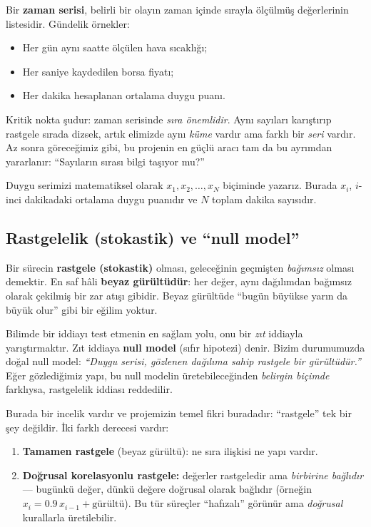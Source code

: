 \documentclass[11pt,a4paper]{article}
\begin{document}
Bir \textbf{zaman serisi}, belirli bir olayın zaman içinde sırayla ölçülmüş
değerlerinin listesidir. Gündelik örnekler:
\begin{itemize}[leftmargin=1.4em]
  \item Her gün aynı saatte ölçülen hava sıcaklığı;
  \item Her saniye kaydedilen borsa fiyatı;
  \item Her dakika hesaplanan ortalama duygu puanı.
\end{itemize}

Kritik nokta şudur: zaman serisinde \emph{sıra önemlidir}. Aynı sayıları
karıştırıp rastgele sırada dizsek, artık elimizde aynı \emph{küme} vardır ama
farklı bir \emph{seri} vardır. Az sonra göreceğimiz gibi, bu projenin en
güçlü aracı tam da bu ayrımdan yararlanır: ``Sayıların sırası bilgi taşıyor mu?''

Duygu serimizi matematiksel olarak $x_1, x_2, \dots, x_N$ biçiminde yazarız.
Burada $x_i$, $i$-inci dakikadaki ortalama duygu puanıdır ve $N$ toplam
dakika sayısıdır.

\subsection{Rastgelelik (stokastik) ve ``null model''}

Bir sürecin \textbf{rastgele (stokastik)} olması, geleceğinin geçmişten
\emph{bağımsız} olması demektir. En saf hâli \textbf{beyaz gürültüdür}:
her değer, aynı dağılımdan bağımsız olarak çekilmiş bir zar atışı gibidir.
Beyaz gürültüde ``bugün büyükse yarın da büyük olur'' gibi bir eğilim yoktur.

Bilimde bir iddiayı test etmenin en sağlam yolu, onu bir \emph{zıt} iddiayla
yarıştırmaktır. Zıt iddiaya \textbf{null model} (sıfır hipotezi) denir.
Bizim durumumuzda doğal null model: \emph{``Duygu serisi, gözlenen dağılıma
sahip rastgele bir gürültüdür.''} Eğer gözlediğimiz yapı, bu null modelin
üretebileceğinden \emph{belirgin biçimde} farklıysa, rastgelelik iddiası
reddedilir.

Burada bir incelik vardır ve projemizin temel fikri buradadır: ``rastgele''
tek bir şey değildir. İki farklı derecesi vardır:
\begin{enumerate}[leftmargin=1.6em]
  \item \textbf{Tamamen rastgele} (beyaz gürültü): ne sıra ilişkisi ne
        yapı vardır.
  \item \textbf{Doğrusal korelasyonlu rastgele:} değerler rastgeledir ama
        \emph{birbirine bağlıdır} --- bugünkü değer, dünkü değere doğrusal
        olarak bağlıdır (örneğin $x_i = 0.9\,x_{i-1} + \text{gürültü}$).
        Bu tür süreçler ``hafızalı'' görünür ama \emph{doğrusal} kurallarla
        üretilebilir.
\end{enumerate}
\end{document}
